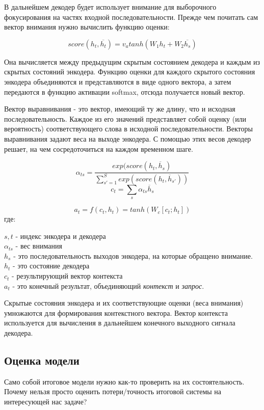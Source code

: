     В дальнейшем декодер будет использует внимание для выборочного фокусирования на частях входной последовательности. Прежде чем почитать сам вектор внимания нужно вычислить функцию оценки: 
    
    $$
	    score(h_t, \overline{h_t}) = v^{}_{a} tanh(W_1 h_t + W_2 \overline{h_s})
	$$
	
	Она вычисляется между предыдущим скрытым состоянием декодера и каждым из скрытых состояний энкодера. Функцию оценки для каждого скрытого состояния энкодера объединяются и представляются в виде одного вектора, а затем передаются в функцию активации softmax, отсюда получается новый вектор. 
	
	Вектор выравнивания - это вектор, имеющий ту же длину, что и исходная последовательность. Каждое из его значений представляет собой оценку (или вероятность) соответствующего слова в исходной последовательности. Векторы выравнивания задают веса на выходе энкодера. С помощью этих весов декодер решает, на чем сосредоточиться на каждом временном шаге.
	
	$$
	    \alpha_{ts} = \frac{exp(score(h_t, \overline h_s)}{\sum^{S}_{s'=1}exp(score(h_t, \overline h_{s'}))}
	$$
	$$
        c_t = \sum_s \alpha_{ts} \overline h_s
	$$
	
	$$
	    a_t = f(c_t, h_t) = tanh(W_c[c_t; h_t])
	$$
	где:
	
	\begin{tabbing}
    	$s, t$ - индекс энкодера и декодера\\
    	$\alpha_{ts}$ - вес внимания\\
    	$h_s$ - это последовательность выходов энкодера, на которые обращено внимание.\\
    	$h_t$ - это состояние декодера\\
    	$c_t$ - результирующий вектор контекста \\
    	$a_t$ - это конечный результат, объединяющий \textit{контекст} и \textit{запрос}.
	\end{tabbing}
	
	Скрытые состояния энкодера и их соответствующие оценки (веса внимания) умножаются для формирования контекстного вектора. Вектор контекста используется для вычисления в дальнейшем конечного выходного сигнала декодера.
	
	\subsection{Оценка модели}
	
	Само собой итоговое модели нужно как-то проверить на их состоятельность. Почему нельзя просто оценить потери/точность итоговой системы на интересующей нас задаче?
	
